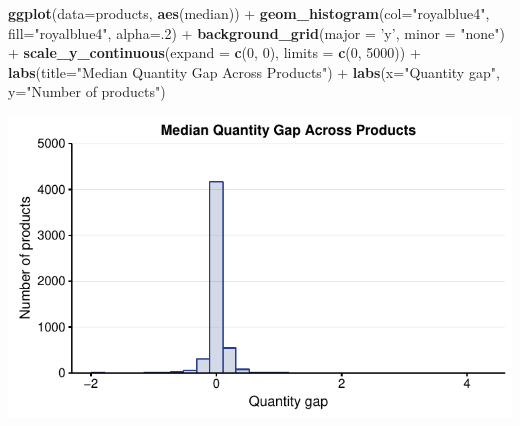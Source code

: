 \documentclass[10pt,]{article}
\newenvironment{Shaded}{\begin{snugshade}}{\end{snugshade}}
\newcommand{\KeywordTok}[1]{\textcolor[rgb]{0.13,0.29,0.53}{\textbf{{#1}}}}
\newcommand{\DataTypeTok}[1]{\textcolor[rgb]{0.13,0.29,0.53}{{#1}}}
\newcommand{\DecValTok}[1]{\textcolor[rgb]{0.00,0.00,0.81}{{#1}}}
\newcommand{\StringTok}[1]{\textcolor[rgb]{0.31,0.60,0.02}{{#1}}}
\newcommand{\NormalTok}[1]{{#1}}
\begin{document}
\begin{Shaded}
\begin{Highlighting}[]
\KeywordTok{ggplot}\NormalTok{(}\DataTypeTok{data=}\NormalTok{products, }\KeywordTok{aes}\NormalTok{(median)) +}
\StringTok{  }\KeywordTok{geom_histogram}\NormalTok{(}\DataTypeTok{col=}\StringTok{"royalblue4"}\NormalTok{,}
                 \DataTypeTok{fill=}\StringTok{"royalblue4"}\NormalTok{,}
                 \DataTypeTok{alpha=}\NormalTok{.}\DecValTok{2}\NormalTok{) +}
\StringTok{  }\KeywordTok{background_grid}\NormalTok{(}\DataTypeTok{major =} \StringTok{'y'}\NormalTok{, }\DataTypeTok{minor =} \StringTok{"none"}\NormalTok{) +}
\StringTok{  }\KeywordTok{scale_y_continuous}\NormalTok{(}\DataTypeTok{expand =} \KeywordTok{c}\NormalTok{(}\DecValTok{0}\NormalTok{, }\DecValTok{0}\NormalTok{), }\DataTypeTok{limits =} \KeywordTok{c}\NormalTok{(}\DecValTok{0}\NormalTok{, }\DecValTok{5000}\NormalTok{)) +}
\StringTok{  }\KeywordTok{labs}\NormalTok{(}\DataTypeTok{title=}\StringTok{"Median Quantity Gap Across Products"}\NormalTok{) +}
\StringTok{  }\KeywordTok{labs}\NormalTok{(}\DataTypeTok{x=}\StringTok{"Quantity gap"}\NormalTok{, }\DataTypeTok{y=}\StringTok{"Number of products"}\NormalTok{)}
\end{Highlighting}
\end{Shaded}

\begin{center}\includegraphics{Figs/qty_summary-3} \end{center}
\end{document}
